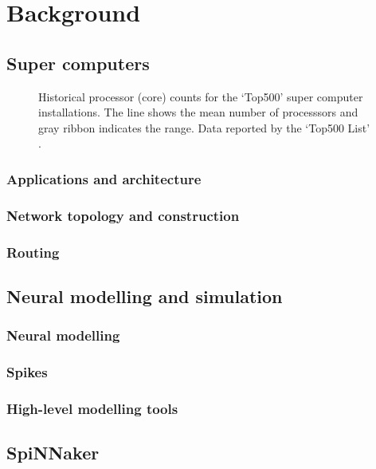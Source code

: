 \chapter{Background}

	\section{Super computers}
		
		\begin{figure}
			\center
			
			\caption{Historical processor (core) counts for the `Top500' super
			computer installations. The line shows the mean number of processsors and
			gray ribbon indicates the range. Data reported by the `Top500 List'
			\cite{meuer15n}.}
			\label{fig:top500-num-processors}
		\end{figure}
		
		\subsection{Applications and architecture}
		\subsection{Network topology and construction}
		\subsection{Routing}
	
	\section{Neural modelling and simulation}
		\subsection{Neural modelling}
		\subsection{Spikes}
		\subsection{High-level modelling tools}
	
	\section{SpiNNaker}
